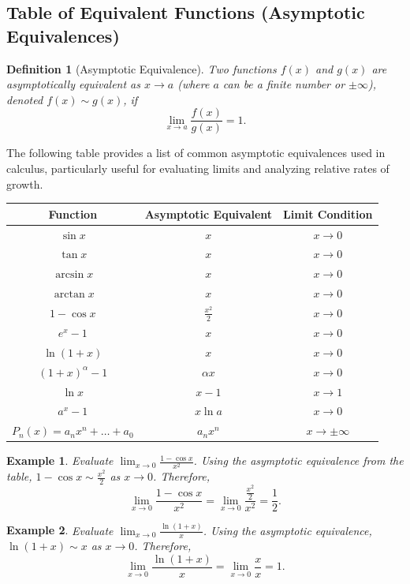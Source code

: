 \documentclass[11pt,a4paper]{article}
\newtheorem{example}{Example}
\newtheorem{definition}{Definition}
\begin{document}
\subsection{Table of Equivalent Functions (Asymptotic Equivalences)}
\begin{definition}[Asymptotic Equivalence]
Two functions $f(x)$ and $g(x)$ are \textit{asymptotically equivalent} as $x \to a$ (where $a$ can be a finite number or $\pm\infty$), denoted $f(x) \sim g(x)$, if
\[
\lim_{x \to a} \frac{f(x)}{g(x)} = 1.
\]
\end{definition}
The following table provides a list of common asymptotic equivalences used in calculus, particularly useful for evaluating limits and analyzing relative rates of growth.
\begin{center}
\begin{tabular}{|c|c|c|}
\hline
\textbf{Function} & \textbf{Asymptotic Equivalent} & \textbf{Limit Condition} \\
\hline
$\sin x$ & $x$ & $x \to 0$ \\
$\tan x$ & $x$ & $x \to 0$ \\
$\arcsin x$ & $x$ & $x \to 0$ \\
$\arctan x$ & $x$ & $x \to 0$ \\
$1 - \cos x$ & $\frac{x^2}{2}$ & $x \to 0$ \\
$e^x - 1$ & $x$ & $x \to 0$ \\
$\ln(1 + x)$ & $x$ & $x \to 0$ \\
$(1 + x)^\alpha - 1$ & $\alpha x$ & $x \to 0$ \\
$\ln x$ & $x - 1$ & $x \to 1$ \\
$a^x - 1$ & $x \ln a$ & $x \to 0$ \\
\hline
$P_n(x) = a_n x^n + \dots + a_0$ & $a_n x^n$ & $x \to \pm\infty$ \\
\hline
\end{tabular}
\end{center}
\begin{example}
Evaluate $\displaystyle \lim_{x \to 0} \frac{1 - \cos x}{x^2}$.
Using the asymptotic equivalence from the table, $1 - \cos x \sim \frac{x^2}{2}$ as $x \to 0$. Therefore,
\[
\lim_{x \to 0} \frac{1 - \cos x}{x^2} = \lim_{x \to 0} \frac{\frac{x^2}{2}}{x^2} = \frac{1}{2}.
\]
\end{example}
\begin{example}
Evaluate $\displaystyle \lim_{x \to 0} \frac{\ln(1 + x)}{x}$.
Using the asymptotic equivalence, $\ln(1 + x) \sim x$ as $x \to 0$. Therefore,
\[
\lim_{x \to 0} \frac{\ln(1 + x)}{x} = \lim_{x \to 0} \frac{x}{x} = 1.
\]
\end{example}
\end{document}
